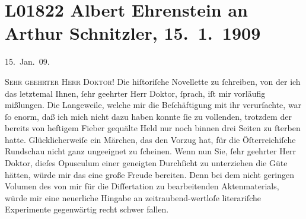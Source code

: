 

\section[Albert Ehrenstein an Arthur Schnitzler, 15. 1. 1909]{L01822 Albert Ehrenstein an Arthur Schnitzler, 15. 1. 1909}
\nopagebreak{}
\rehead{ }\normalsize\beginnumbering{}
\toendnotes[C]{\smallbreak\pagebreak[2]}
\toendnotes[C]{\smallbreak}
\pstart
           \raggedleft{}{\pb}15. Jan. 09.\pend
           
\pstart{}\textsc{Sehr geehrter Herr Doktor!}\pend\vspace{0.5em}
\pstart
           Die hiſtoriſche Novellette zu ſchreiben, von der ich das letztemal Ihnen, ſehr geehrter Herr
               Doktor, ſprach, iſt mir vorläufig mißlungen. Die Langeweile, welche mir die
               Beſchäftigung mit ihr verurſachte, war ſo enorm, daß ich mich nicht dazu haben konnte
               ſie zu vollenden, trotzdem der bereits von heftigem Fieber gequälte Held nur noch
               binnen drei Seiten zu ſterben hatte. Glücklicherweiſe \label{K_L01822-1v}\label{K_L01822-1} ein Märchen, das den Vorzug hat, für die Öſterreichiſche Rundschau nicht ganz ungeeignet zu ſcheinen. Wenn nun Sie,
                  {\pb}ſehr geehrter Herr Doktor, dieſes Opusculum einer geneigten
               Durchſicht zu unterziehen die Güte hätten, würde mir das eine große Freude bereiten.
               Denn bei dem nicht geringen Volumen des von mir für die Diſſertation zu bearbeitenden
               Aktenmaterials, würde mir eine neuerliche Hingabe an zeitraubend-wertloſe
               literariſche Experimente gegenwärtig recht schwer fallen.\pend
           
